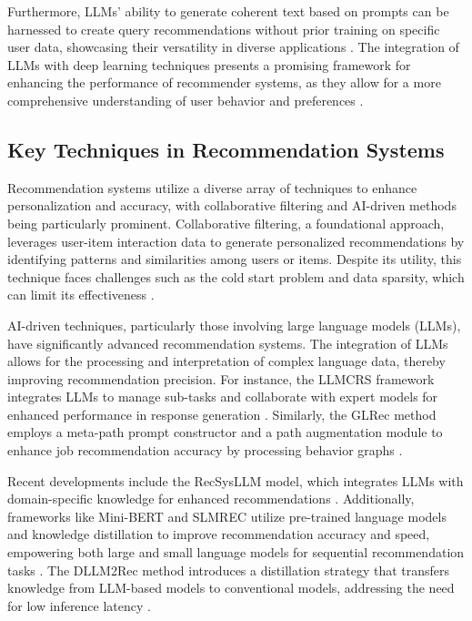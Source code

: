 Furthermore, LLMs' ability to generate coherent text based on prompts can be harnessed to create query recommendations without prior training on specific user data, showcasing their versatility in diverse applications \cite{bacciu2024generatingqueryrecommendationsllms}. The integration of LLMs with deep learning techniques presents a promising framework for enhancing the performance of recommender systems, as they allow for a more comprehensive understanding of user behavior and preferences \cite{tian2024mmrecllmbasedmultimodal}.





\subsection{Key Techniques in Recommendation Systems} \label{subsec:Key Techniques in Recommendation Systems}



Recommendation systems utilize a diverse array of techniques to enhance personalization and accuracy, with collaborative filtering and AI-driven methods being particularly prominent. Collaborative filtering, a foundational approach, leverages user-item interaction data to generate personalized recommendations by identifying patterns and similarities among users or items. Despite its utility, this technique faces challenges such as the cold start problem and data sparsity, which can limit its effectiveness \cite{xu2024emerging}.



AI-driven techniques, particularly those involving large language models (LLMs), have significantly advanced recommendation systems. The integration of LLMs allows for the processing and interpretation of complex language data, thereby improving recommendation precision. For instance, the LLMCRS framework integrates LLMs to manage sub-tasks and collaborate with expert models for enhanced performance in response generation \cite{feng2023largelanguagemodelenhanced}. Similarly, the GLRec method employs a meta-path prompt constructor and a path augmentation module to enhance job recommendation accuracy by processing behavior graphs \cite{wu2023exploringlargelanguagemodel}.



Recent developments include the RecSysLLM model, which integrates LLMs with domain-specific knowledge for enhanced recommendations \cite{chu2023leveraging}. Additionally, frameworks like Mini-BERT and SLMREC utilize pre-trained language models and knowledge distillation to improve recommendation accuracy and speed, empowering both large and small language models for sequential recommendation tasks . The DLLM2Rec method introduces a distillation strategy that transfers knowledge from LLM-based models to conventional models, addressing the need for low inference latency \cite{cui2024distillationmattersempoweringsequential}.



